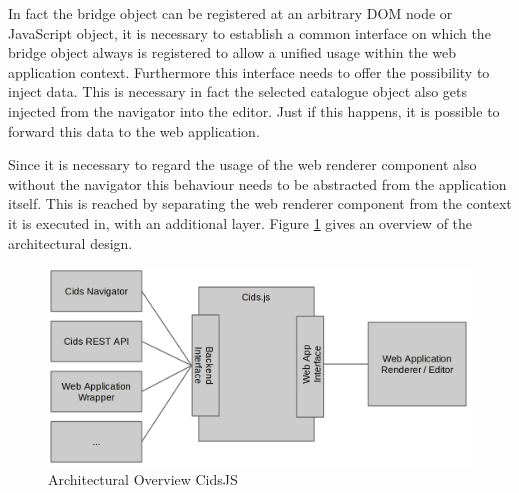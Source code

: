 In fact the bridge object can be registered at an arbitrary DOM node or JavaScript object,  it is necessary to establish a common interface on which the bridge object always is registered to allow a unified usage within the web application context. 
Furthermore this interface needs to offer the possibility to inject data.
This is necessary in fact the selected catalogue object also gets injected from the navigator into the editor.
Just if this happens, it is possible to forward this data to the web application. 

Since it is necessary to regard  the usage of the web renderer component also without the navigator this  behaviour needs to be abstracted from the application itself.
This is reached by separating the web renderer component from the context it is executed in, with an additional layer.
Figure \ref{fig:cidsJS} gives an overview of the architectural design.

\begin{figure}
	\centering	\includegraphics[width=1.0\textwidth]{./img/impl/cidsJS.png}
	\caption{Architectural Overview CidsJS}
	\label{fig:cidsJS}
\end{figure}

